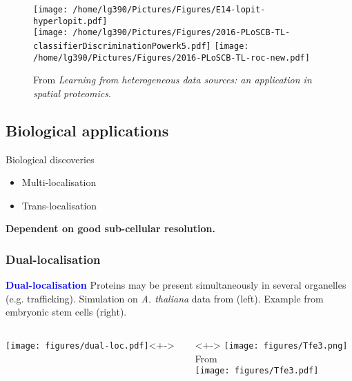 \begin{frame}{}

  \begin{figure}[h]
    \centering
    \texttt{[image: /home/lg390/Pictures/Figures/E14-lopit-hyperlopit.pdf]} \\
    \texttt{[image: /home/lg390/Pictures/Figures/2016-PLoSCB-TL-classifierDiscriminationPowerk5.pdf]}
    \texttt{[image: /home/lg390/Pictures/Figures/2016-PLoSCB-TL-roc-new.pdf]}    
    \caption{{\footnotesize From \cite{Breckels:2016} \textit{Learning from
          heterogeneous data sources: an application in spatial
          proteomics}.}
    }
\label{fig:tlres}
  \end{figure}
  
\end{frame}

\subsection{Biological applications}

\begin{frame}{Biological discoveries}
  \begin{itemize}
  \item Multi-localisation
  \item Trans-localisation
  \end{itemize}
  \textbf{Dependent on good sub-cellular resolution.}
\end{frame}

\subsubsection{Dual-localisation}

\begin{frame}
  \textcolor{Blue}{\textbf{Dual-localisation}} Proteins may be present
  simultaneously in several organelles (e.g. trafficking). Simulation
  on \textit{A. thaliana} data from \cite{Dunkley:2006}
  \citep{Gatto:2014a} (left). Example from embryonic stem cells
  \citep{Christoforou:2016} (right).
  \begin{columns}
    \begin{column}{.5\textwidth}
      \texttt{[image: figures/dual-loc.pdf]}<+->
    \end{column}
    \begin{column}{.5\textwidth}<+->
      \centering
      \texttt{[image: figures/Tfe3.png]}\\
      \tiny From \cite{Betschinger:2013} \\
      \texttt{[image: figures/Tfe3.pdf]}
    \end{column}  
  \end{columns}
\end{frame}

